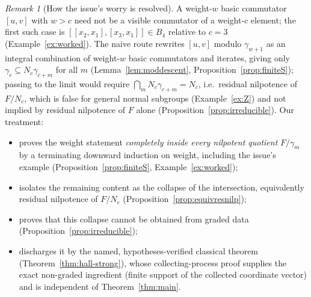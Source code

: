 \documentclass{amsart}
\theoremstyle{definition}
\theoremstyle{remark}
\newtheorem{remark}{Remark}
\begin{document}
\begin{remark}[How the issue's worry is resolved]\label{rem:issue}
A weight-$w$ basic commutator $[u,v]$ with $w>c$ need not be a visible commutator of a
weight-$c$ element; the first such case is $[[x_2,x_1],[x_3,x_1]]\in B_4$ relative to
$c=3$ (Example~\ref{ex:worked}). The naive route rewrites $[u,v]$ modulo
$\gamma_{w+1}$ as an integral combination of weight-$w$ basic commutators and
iterates, giving only $\gamma_c\subseteq N_c\gamma_{c+m}$ for all $m$
(Lemma~\ref{lem:moddescent}, Proposition~\ref{prop:finiteS}); passing to the limit
would require $\bigcap_m N_c\gamma_{c+m}=N_c$, i.e.\ residual nilpotence of $F/N_c$,
which is false for general normal subgroups (Example~\ref{ex:Z}) and not implied by
residual nilpotence of $F$ alone (Proposition~\ref{prop:irreducible}). Our treatment:
\begin{itemize}
\item proves the weight statement \emph{completely inside every nilpotent quotient}
$F/\gamma_m$ by a terminating downward induction on weight, including the issue's
example (Proposition~\ref{prop:finiteS}, Example~\ref{ex:worked});
\item isolates the remaining content as the collapse of the intersection,
equivalently residual nilpotence of $F/N_c$ (Proposition~\ref{prop:equivresnilp});
\item proves that this collapse cannot be obtained from graded data
(Proposition~\ref{prop:irreducible});
\item discharges it by the named, hypotheses-verified classical theorem
(Theorem~\ref{thm:hall-strong}), whose collecting-process proof supplies the exact
non-graded ingredient (finite support of the collected coordinate vector) and is
independent of Theorem~\ref{thm:main}.
\end{itemize}
\end{remark}
\end{document}
